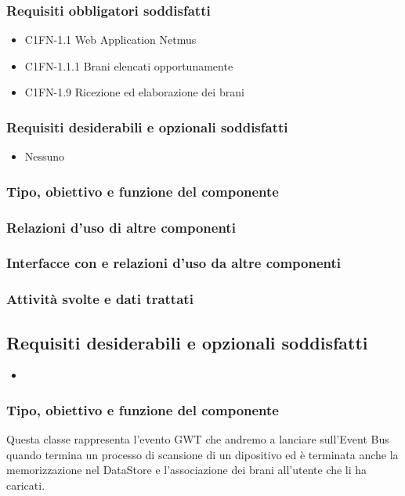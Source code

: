 \subsubsection*{Requisiti obbligatori soddisfatti}
\begin{itemize}
    \item C1FN-1.1 Web Application Netmus
    \item C1FN-1.1.1 Brani elencati opportunamente
    \item C1FN-1.9 Ricezione ed elaborazione dei brani
\end{itemize}
\subsubsection*{Requisiti desiderabili e opzionali soddisfatti}
\begin{itemize}
    \item Nessuno
\end{itemize}
\subsubsection*{Tipo, obiettivo e funzione del componente}
\subsubsection*{Relazioni d'uso di altre componenti}
\subsubsection*{Interfacce con e relazioni d'uso da altre componenti}
\subsubsection*{Attivit\`a svolte e dati trattati}
\subsection*{Requisiti desiderabili e opzionali soddisfatti}
\begin{itemize}
    \item 
\end{itemize}
\subsubsection*{Tipo, obiettivo e funzione del componente}
Questa classe rappresenta l'evento GWT che andremo a lanciare sull'Event Bus
quando termina un processo di scansione di un dipositivo ed \`e terminata
anche la memorizzazione nel DataStore e l'associazione dei brani all'utente che
li ha caricati. 

